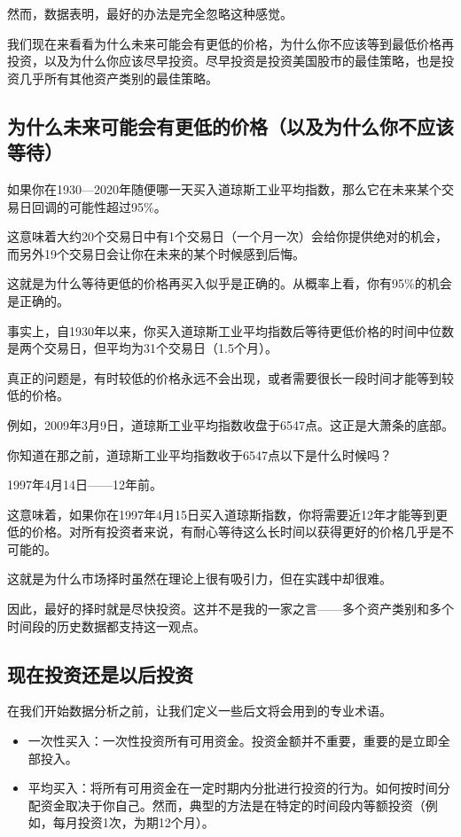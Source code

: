 然而，数据表明，最好的办法是完全忽略这种感觉。

我们现在来看看为什么未来可能会有更低的价格，为什么你不应该等到最低价格再投资，以及为什么你应该尽早投资。尽早投资是投资美国股市的最佳策略，也是投资几乎所有其他资产类别的最佳策略。

\subsection{为什么未来可能会有更低的价格（以及为什么你不应该等待）}
如果你在1930—2020年随便哪一天买入道琼斯工业平均指数，那么它在未来某个交易日回调的可能性超过95\%。

这意味着大约20个交易日中有1个交易日（一个月一次）会给你提供绝对的机会，而另外19个交易日会让你在未来的某个时候感到后悔。

这就是为什么等待更低的价格再买入似乎是正确的。从概率上看，你有95\%的机会是正确的。

事实上，自1930年以来，你买入道琼斯工业平均指数后等待更低价格的时间中位数是两个交易日，但平均为31个交易日（1.5个月）。

真正的问题是，有时较低的价格永远不会出现，或者需要很长一段时间才能等到较低的价格。

例如，2009年3月9日，道琼斯工业平均指数收盘于6547点。这正是大萧条的底部。

你知道在那之前，道琼斯工业平均指数收于6547点以下是什么时候吗？

1997年4月14日——12年前。

这意味着，如果你在1997年4月15日买入道琼斯指数，你将需要近12年才能等到更低的价格。对所有投资者来说，有耐心等待这么长时间以获得更好的价格几乎是不可能的。

这就是为什么市场择时虽然在理论上很有吸引力，但在实践中却很难。

因此，最好的择时就是尽快投资。这并不是我的一家之言——多个资产类别和多个时间段的历史数据都支持这一观点。

\subsection{现在投资还是以后投资}

在我们开始数据分析之前，让我们定义一些后文将会用到的专业术语。

\begin{itemize}
\item 一次性买入：一次性投资所有可用资金。投资金额并不重要，重要的是立即全部投入。
\item 平均买入：将所有可用资金在一定时期内分批进行投资的行为。如何按时间分配资金取决于你自己。然而，典型的方法是在特定的时间段内等额投资（例如，每月投资1次，为期12个月）。
\end{itemize}


